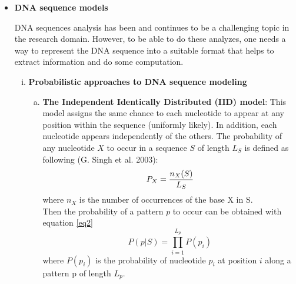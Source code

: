 \documentclass[10pt,twocolumn,letterpaper]{article}
\begin{document}
{\begin{itemize}
   \item \textbf{DNA sequence models}
   \par{
       DNA sequences analysis has been and continues to be a challenging topic in the research domain. However, to be able to do these analyzes, one needs a way to represent the DNA sequence into a suitable format 
       that helps to extract information and do some computation.
       \begin{enumerate}[i.]
           \item \textbf{Probabilistic approaches to DNA sequence modeling}
           \begin{enumerate}[a.]
               \item \textbf{The Independent Identically Distributed (IID) model}: This model assigns the same chance to each nucleotide to appear at any position within the sequence (uniformly likely).
               In addition, each nucleotide appears independently of the others. The probability of any nucleotide \(X\) to occur in a sequence \(S\) of length \(L_S\) is defined as following (G. Singh et al. 2003):
               \begin{equation}
                   P_X = \frac{n_{X}(S)}{L_S}\\
                   \label{eq1}
               \end{equation}
               where \(n_X\) is the number of occurrences of the base X in S.\\
               Then the probability of a pattern \(p\) to occur can be obtained with equation \ref{eq2}
               \begin{equation}
                    P(p | S) = \prod_{i=1}^{L_p} P(p_i)
                   \label{eq2}
               \end{equation}
               where \(P(p_i)\) is the probability of nucleotide \(p_i\) at position \(i\) along a pattern p of length \(L_p\).\\
               

\end{enumerate}
\end{enumerate}}
\end{itemize}}
\end{document}
